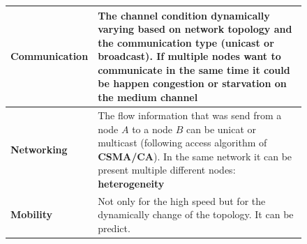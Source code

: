 \newpage
\begin{figure}[h]
    \noindent
    \begin{minipage}[t]{0.05\textwidth}
        \vfill
        \begin{center}  \end{center}
        \vfill
    \end{minipage}
    \begin{minipage}[t]{0.9\textwidth}
        \centering
        \begin{tabular}{
            |p{}
            |p{}|   
        } \hline
        
            \textbf{Communication} & The channel condition dynamically varying based on network topology and the communication type (unicast or broadcast). If multiple nodes want to communicate in the same time it could be happen \textbf{congestion} or \textbf{starvation} on the medium channel \\ \hline

            \textbf{Networking} & The flow information that was send from a node $A$ to a node $B$ can be unicat or multicast (following access algorithm of \textbf{CSMA/CA}). In the same network it can be present multiple different nodes: \textbf{heterogeneity}\\ \hline

            \textbf{Mobility} & Not only for the high speed but for the dynamically change of the topology. It can be predict.\\ \hline

        \end{tabular}
    \end{minipage}
\end{figure}

